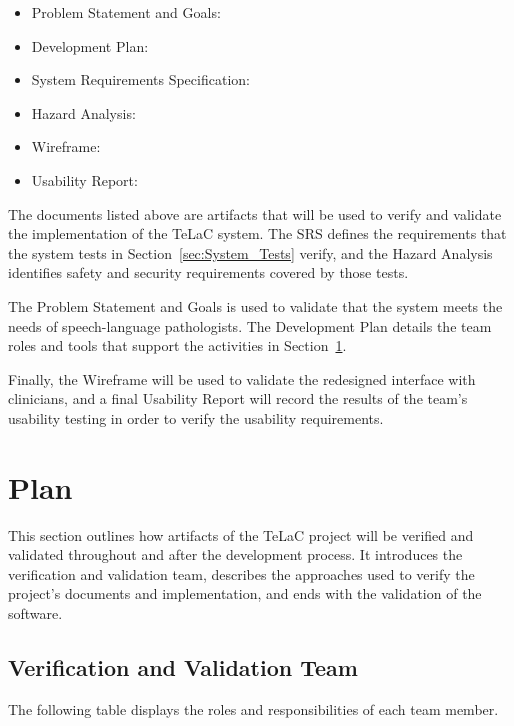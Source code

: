 \documentclass[12pt, titlepage]{article}
\renewcommand{\_}{\oldunderscore\allowbreak}
\begin{document}
\begin{itemize}
  \item Problem Statement and Goals: \citet{ProblemStatement}
  \item Development Plan: \citet{DevelopmentPlan}
  \item System Requirements Specification: \citet{SRS}
  \item Hazard Analysis: \citet{HazardAnalysis}
  \item Wireframe: \citet{Wireframe}
  \item Usability Report: \citet{UsabilityReport}
\end{itemize}
The documents listed above are artifacts that will be used to verify and validate
the implementation of the TeLaC system. The SRS defines the requirements that
the system tests in Section~\ref{sec:System_Tests} verify, and the Hazard Analysis
identifies safety and security requirements covered by those tests.

The Problem Statement and Goals is used to validate that the system
meets the needs of speech-language pathologists. The Development Plan details
the team roles and tools that support the activities in Section~\ref{sec:Plan}.

Finally, the Wireframe will be used to validate the redesigned interface with
clinicians, and a final Usability Report will record the results of the team's
usability testing in order to verify the usability requirements.

\section{Plan} \label{sec:Plan}
This section outlines how artifacts of the TeLaC project will be verified and validated
throughout and after the development process. It introduces the verification and
validation team, describes the approaches used to verify the project's documents
and implementation, and ends with the validation of the software.

  \subsection{Verification and Validation Team}

\hspace{2em}The following table displays the roles and responsibilities of each team member.
\end{document}

